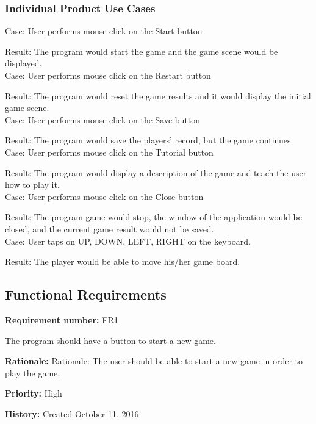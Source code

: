 \documentclass[12pt,letterpaper]{article}
\begin{document}
\subsubsection{Individual Product Use Cases}
	Case: User performs mouse click on the Start button

Result: The program would start the game and the game scene would be displayed.\\

Case: User performs mouse click on the Restart button

Result: The program would reset the game results and it would display the initial game scene.\\

Case: User performs mouse click on the Save button

Result:  The program would save the players’ record, but the game continues. \\

Case: User performs mouse click on the Tutorial button

Result: The program would display a description of the game and teach the user how to play it.\\

Case: User performs mouse click on the Close button

Result: The program game would stop, the window of the application would be closed, and the current game result would not be saved.\\

Case: User taps on UP, DOWN, LEFT, RIGHT on the keyboard.

Result: The player would be able to move his/her game board.\\


	\subsection{Functional Requirements}

\begin{reqbox}
	\begin{itemize}
		\textbf{Requirement number: }FR1  
		
		The program should have a button to start a new game.  
		 
		\textbf{Rationale: }Rationale: The user should be able to start a new game in order to play the game.
		
		\textbf{Priority: }High

		\textbf{History: }Created October 11, 2016
	\end{itemize}
\end{reqbox}
\end{document}
